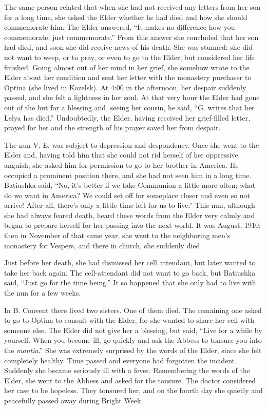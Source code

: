 The same person related that when she had not received any letters from her son for a long time, she asked the Elder whether he had died and how she should commemorate him. The Elder answered, ``It makes no difference how you commemorate, just commemorate.'' From this answer she concluded that her son had died, and soon she did receive news of his death. She was stunned: she did not want to weep, or to pray, or even to go to the Elder, but considered her life finished. Going almost out of her mind in her grief, she somehow wrote to the Elder about her condition and sent her letter with the monastery purchaser to Optina (she lived in Kozelsk). At 4:00 in the afternoon, her despair suddenly passed, and she felt a lightness in her soul. At that very hour the Elder had gone out of the hut for a blessing and, seeing her cousin, he said, ``G. writes that her Lelya has died.'' Undoubtedly, the Elder, having received her grief-filled letter, prayed for her and the strength of his prayer saved her from despair.

The nun V. E. was subject to depression and despondency. Once she went to the Elder and, having told him that she could not rid herself of her oppressive anguish, she asked him for permission to go to her brother in America. He occupied a prominent position there, and she had not seen him in a long time. Batiushka said, ``No, it's better if we take Communion a little more often; what do we want in America? We could set off for someplace closer and even so not arrive! After all, there's only a little time left for us to live.'' This nun, although she had always feared death, heard these words from the Elder very calmly and began to prepare herself for her passing into the next world. It was August, 1910; then in November of that same year, she went to the neighboring men's monastery for Vespers, and there in church, she suddenly died.

Just before her death, she had dismissed her cell attendant, but later wanted to take her back again. The cell-attendant did not want to go back, but Batiushka said, ``Just go for the time being.'' It so happened that she only had to live with the nun for a few weeks.

In B. Convent there lived two sisters. One of them died. The remaining one asked to go to Optina to consult with the Elder, for she wanted to share her cell with someone else. The Elder did not give her a blessing, but said, ``Live for a while by yourself. When you become ill, go quickly and ask the Abbess to tonsure you into the \textit{mantia}.'' She was extremely surprised by the words of the Elder, since she felt completely healthy. Time passed and everyone had forgotten the incident. Suddenly she became seriously ill with a fever. Remembering the words of the Elder, she went to the Abbess and asked for the tonsure. The doctor considered her case to be hopeless. They tonsured her, and on the fourth day she quietly and peacefully passed away during Bright Week.

